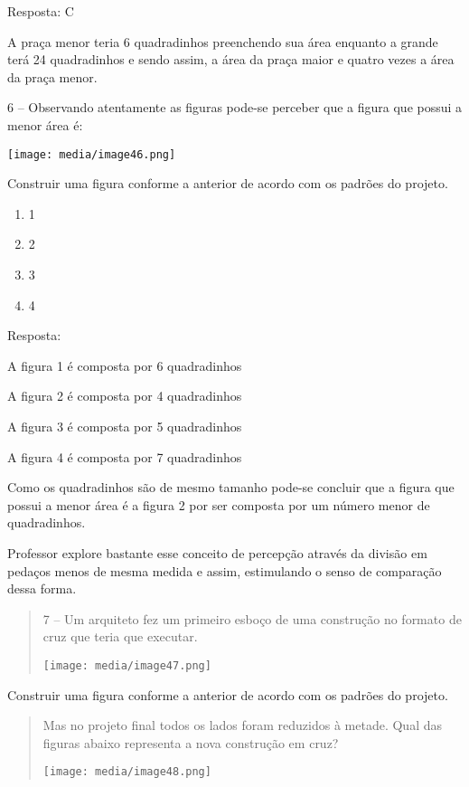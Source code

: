 Resposta: C

A praça menor teria 6 quadradinhos preenchendo sua área enquanto a
grande terá 24 quadradinhos e sendo assim, a área da praça maior e
quatro vezes a área da praça menor.

6 -- Observando atentamente as figuras pode-se perceber que a figura que
possui a menor área é:

\texttt{[image: media/image46.png]}

Construir uma figura conforme a anterior de acordo com os padrões do
projeto.

\begin{enumerate}
\def\labelenumi{\alph{enumi})}
\item
  1
\item
  2
\item
  3
\item
  4
\end{enumerate}

Resposta:

A figura 1 é composta por 6 quadradinhos

A figura 2 é composta por 4 quadradinhos

A figura 3 é composta por 5 quadradinhos

A figura 4 é composta por 7 quadradinhos

Como os quadradinhos são de mesmo tamanho pode-se concluir que a figura
que possui a menor área é a figura 2 por ser composta por um número
menor de quadradinhos.

Professor explore bastante esse conceito de percepção através da divisão
em pedaços menos de mesma medida e assim, estimulando o senso de
comparação dessa forma.

\begin{quote}
7 -- Um arquiteto fez um primeiro esboço de uma construção no formato de
cruz que teria que executar.

\texttt{[image: media/image47.png]}
\end{quote}

Construir uma figura conforme a anterior de acordo com os padrões do
projeto.

\begin{quote}
Mas no projeto final todos os lados foram reduzidos à metade. Qual das
figuras abaixo representa a nova construção em cruz?

\texttt{[image: media/image48.png]}
\end{quote}

